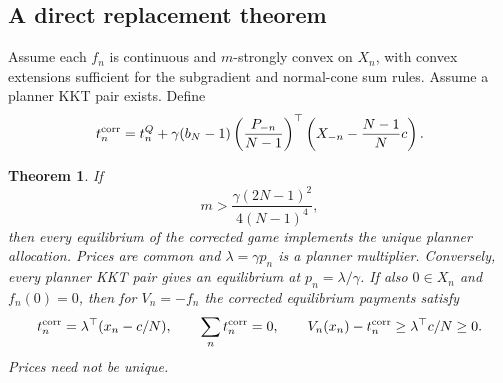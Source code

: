 \documentclass{article}
\newtheorem{theorem}{Theorem}
\begin{document}
\subsection{A direct replacement theorem}
Assume each \(f_n\) is continuous and \(m\)-strongly convex on \(X_n\),
with convex extensions sufficient for the subgradient and normal-cone sum
rules. Assume a planner KKT pair exists. Define
\begin{equation}\label{eq:repair}
 t_n^{\rm corr}=t_n^Q+
 \gamma(b_N-1)\left(\frac{P_{-n}}{N-1}\right)^\top
 \left(X_{-n}-\frac{N-1}{N}c\right).
\end{equation}
\begin{theorem}\label{thm:implementation}
If
\begin{equation}\label{eq:threshold}
 m>\frac{\gamma(2N-1)^2}{4(N-1)^4},
\end{equation}
then every equilibrium of the corrected game implements the unique planner
allocation. Prices are common and \(\lambda=\gamma p_n\) is a planner
multiplier. Conversely, every planner KKT pair gives an equilibrium at
\(p_n=\lambda/\gamma\). If also \(0\in X_n\) and \(f_n(0)=0\),
then for \(V_n=-f_n\) the corrected equilibrium payments satisfy
\begin{equation}\label{eq:transfers}
 t_n^{\rm corr}=\lambda^\top(x_n-c/N),\qquad
 \sum_nt_n^{\rm corr}=0,\qquad
 V_n(x_n)-t_n^{\rm corr}\ge\lambda^\top c/N\ge0.
\end{equation}
Prices need not be unique.
\end{theorem}
\end{document}
